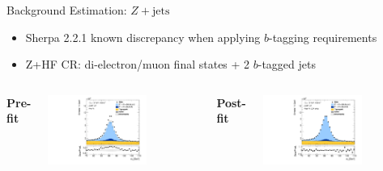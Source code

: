 \documentclass[11pt, xcolor={dvipsnames}, aspectratio=169]{beamer}
\begin{document}
\begin{frame}{Background Estimation: $Z + \text{jets}$}
  \begin{itemize}
  \item Sherpa 2.2.1 known discrepancy when applying $b$-tagging requirements
  \item Z+HF CR: di-electron/muon final states + 2 $b$-tagged jets
  \end{itemize}

  \vspace*{0.5em}

  \begin{columns}[onlytextwidth]
    \centering

    \textbf{Pre-fit}

    \includegraphics[width=0.65\textwidth]{zhfcr/Region_BMin0_incJet1_Y2015_DZllbbCR_T2_L2_distmLL_J2_Prefit_fixed}

    \centering

    \textbf{Post-fit}

    \includegraphics[width=0.65\textwidth]{zhfcr/Region_BMin0_incJet1_Y2015_DZllbbCR_T2_L2_distmLL_J2_GlobalFit_conditionnal_mu0_fixed}
  \end{columns}
\end{frame}

\end{document}
